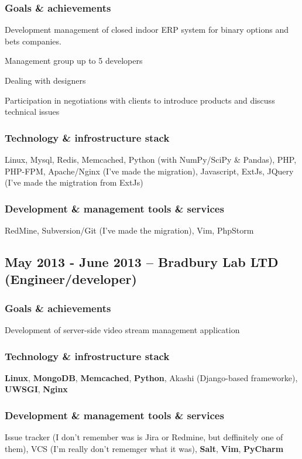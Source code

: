 \documentclass[9pt, a4paper, english]{extarticle}
\begin{document}
    \subsubsection* {Goals \& achievements}
      \begin {list}{\textbullet}{\itemsep=0mm}
        \item Development management of closed indoor ERP system for binary options and bets companies.
        \item Management group up to 5 developers
        \item Dealing with designers
        \item Participation in negotiations with clients to introduce products and discuss technical issues
      \end{list}
    \subsubsection* {Technology \& infrostructure stack}
      Linux, Mysql, Redis, Memcached, Python (with NumPy/SciPy \& Pandas),
      PHP, PHP-FPM, Apache/Nginx (I've made the migration), Javascript,
      ExtJs, JQuery (I've made the migtration from ExtJs)
    \subsubsection* {Development \& management tools \& services}
      RedMine, Subversion/Git (I've made the migration), Vim, PhpStorm


  \subsection* {May 2013 - June 2013 -- \textbf{Bradbury Lab LTD} (Engineer/developer)}
    \subsubsection* {Goals \& achievements}
      Development of server-side video stream management application
    \subsubsection* {Technology \& infrostructure stack}
      \textbf{Linux}, \textbf{MongoDB}, \textbf{Memcached}, \textbf{Python}, Akashi (Django-based frameworke),
      \textbf{UWSGI}, \textbf{Nginx}
    \subsubsection* {Development \& management tools \& services}
      Issue tracker (I don't remember was is Jira or Redmine, but deffinitely one of them), VCS (I'm really
      don't rememger what it was), \textbf{Salt}, \textbf{Vim}, \textbf{PyCharm}
\end{document}
